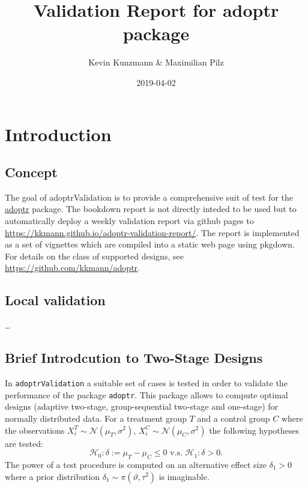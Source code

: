 \documentclass[]{book}
\title{Validation Report for \textbf{adoptr} package}
\author{Kevin Kunzmann \& Maximilian Pilz}
\date{2019-04-02}
\begin{document}
\maketitle

{
\setcounter{tocdepth}{1}
\tableofcontents
}
\hypertarget{introduction}{%
\chapter{Introduction}\label{introduction}}

\hypertarget{concept}{%
\section{Concept}\label{concept}}

The goal of adoptrValidation is to provide a comprehensive suit of test
for the \href{https://github.com/kkmann/adoptr}{adoptr} package.
The bookdown report is not directly inteded to be used but to automatically
deploy a weekly validation report via github pages to
\url{https://kkmann.github.io/adoptr-validation-report/}.
The report is implemented as a set of vignettes which are compiled
into a static web page using pkgdown.
For details on the class of supported designs, see
\url{https://github.com/kkmann/adoptr}.

\hypertarget{local-validation}{%
\section{Local validation}\label{local-validation}}

\ldots{}

\hypertarget{brief-introdcution-to-two-stage-designs}{%
\section{Brief Introdcution to Two-Stage Designs}\label{brief-introdcution-to-two-stage-designs}}

In \texttt{adoptrValidation} a suitable set of cases is tested in order to
validate the performance of the package \texttt{adoptr}.
This package allows to compute optimal designs (adaptive two-stage,
group-sequential two-stage and one-stage) for normally distributed data.
For a treatment group \(T\) and a control group \(C\) where
the observations \(X_i^T \sim \mathcal{N} (\mu_T, \sigma^2)\),
\(X_i^C \sim \mathcal{N} (\mu_C, \sigma^2)\) the following hypotheses are
tested:
\[
\mathcal{H}_0: \delta := \mu_T - \mu_C \leq 0 \text{ v.s. }
\mathcal{H_1}: \delta > 0. 
\]
The power of a test procedure is computed on an alternative effect size
\(\delta_1 > 0\) where a prior distribution
\(\delta_1 \sim \pi(\vartheta, \tau^2)\) is imaginable.
\end{document}
